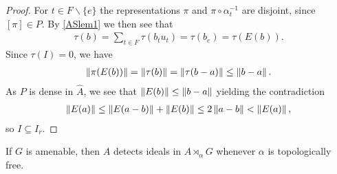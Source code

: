 \begin{proof}
	For $t \in F\backslash\{e\}$ the representations $\pi$ and $\pi \circ \alpha_{t}^{-1}$ are disjoint, since $[\pi] \in P$. By \cref{ASlem1} we then see that
	\begin{align*}
		\tau(b) = \sum_{t \in F} \tau(b_t u_t) = \tau(b_e) = \tau(E(b)).
	\end{align*}
	Since $\tau(I) = 0$, we have
	\begin{align*}
		\left\lVert \pi(E(b))\right\rVert = \left\lVert \tau(b) \right\rVert = \left\lVert \tau(b-a)\right\rVert \leq \left\lVert b-a\right\rVert.
	\end{align*}
	As $P$ is dense in $\hat A$, we see that $\left\lVert E(b)\right\rVert \leq \left\lVert b-a\right\rVert$ yielding the contradiction
	\begin{align*}
		\left\lVert E(a) \right\rVert \leq \left\lVert E(a-b)\right\rVert + \left\lVert E(b)\right\rVert \leq 2 \left\lVert a-b\right\rVert <  \left\lVert E(a)\right\rVert,
	\end{align*}
	so $I \subseteq I_r$.
\end{proof}
\begin{corollary}
	If $G$ is amenable, then $A$ detects ideals in $A \rtimes_\alpha G$ whenever $\alpha$ is topologically free.
\end{corollary}

